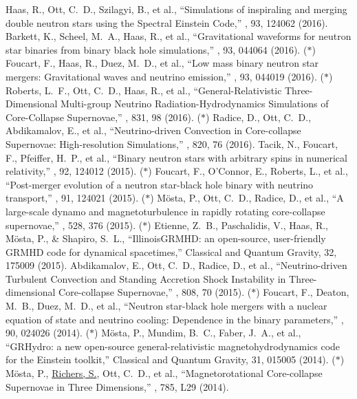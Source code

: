  Haas, R., Ott, C.~D., Szilagyi, B., et al., ``Simulations of inspiraling and merging double neutron stars using the Spectral Einstein Code,'' \prd, 93, 124062 (2016).
 Barkett, K., Scheel, M.~A., Haas, R., et al., ``Gravitational waveforms for neutron star binaries from binary black hole simulations,'' \prd, 93, 044064 (2016).
 ($*$) Foucart, F., Haas, R., Duez, M.~D., et al., ``Low mass binary neutron star mergers: Gravitational waves and neutrino emission,'' \prd, 93, 044019 (2016).
 ($*$) Roberts, L.~F., Ott, C.~D., Haas, R., et al., ``General-Relativistic Three-Dimensional Multi-group Neutrino Radiation-Hydrodynamics Simulations of Core-Collapse Supernovae,'' \apj, 831, 98 (2016).
 ($*$) Radice, D., Ott, C.~D., Abdikamalov, E., et al., ``Neutrino-driven Convection in Core-collapse Supernovae: High-resolution Simulations,'' \apj, 820, 76 (2016).
 Tacik, N., Foucart, F., Pfeiffer, H.~P., et al., ``Binary neutron stars with arbitrary spins in numerical relativity,'' \prd, 92, 124012 (2015).
 ($*$) Foucart, F., O'Connor, E., Roberts, L., et al., ``Post-merger evolution of a neutron star-black hole binary with neutrino transport,'' \prd, 91, 124021 (2015).
 ($*$) M{\"o}sta, P., Ott, C.~D., Radice, D., et al., ``A large-scale dynamo and magnetoturbulence in rapidly rotating core-collapse supernovae,'' \nat, 528, 376 (2015).
 ($*$) Etienne, Z.~B., Paschalidis, V., Haas, R., M{\"o}sta, P., \& Shapiro, S.~L., ``IllinoisGRMHD: an open-source, user-friendly GRMHD code for dynamical spacetimes,'' Classical and Quantum Gravity, 32, 175009 (2015).
 Abdikamalov, E., Ott, C.~D., Radice, D., et al., ``Neutrino-driven Turbulent Convection and Standing Accretion Shock Instability in Three-dimensional Core-collapse Supernovae,'' \apj, 808, 70 (2015).
 ($*$) Foucart, F., Deaton, M.~B., Duez, M.~D., et al., ``Neutron star-black hole mergers with a nuclear equation of state and neutrino cooling: Dependence in the binary parameters,'' \prd, 90, 024026 (2014).
 ($*$) M{\"o}sta, P., Mundim, B.~C., Faber, J.~A., et al., ``GRHydro: a new open-source general-relativistic magnetohydrodynamics code for the Einstein toolkit,'' Classical and Quantum Gravity, 31, 015005 (2014).
 ($*$) M{\"o}sta, P., \underline{Richers, S.}, Ott, C.~D., et al., ``Magnetorotational Core-collapse Supernovae in Three Dimensions,'' \apjl, 785, L29 (2014).
